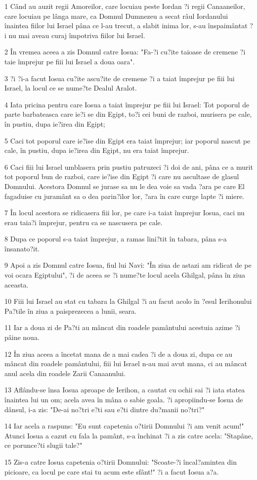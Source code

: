 \par 1 Când au auzit regii Amoreilor, care locuiau peste Iordan ?i regii Canaaneilor, care locuiau pe lânga mare, ca Domnul Dumnezeu a secat râul Iordanului înaintea fiilor lui Israel pâna ce l-au trecut, a slabit inima lor, s-au înspaimântat ?i nu mai aveau curaj împotriva fiilor lui Israel.
\par 2 În vremea aceea a zis Domnul catre Iosua: "Fa-?i cu?ite taioase de cremene ?i taie împrejur pe fiii lui Israel a doua oara".
\par 3 ?i ?i-a facut Iosua cu?ite ascu?ite de cremene ?i a taiat împrejur pe fiii lui Israel, la locul ce se nume?te Dealul Aralot.
\par 4 Iata pricina pentru care Iosua a taiat împrejur pe fiii lui Israel: Tot poporul de parte barbateasca care ie?i se din Egipt, to?i cei buni de razboi, murisera pe cale, în pustiu, dupa ie?irea din Egipt;
\par 5 Caci tot poporul care ie?ise din Egipt era taiat împrejur; iar poporul nascut pe cale, în pustiu, dupa ie?irea din Egipt, nu era taiat împrejur.
\par 6 Caci fiii lui Israel umblasera prin pustiu patruzeci ?i doi de ani, pâna ce a murit tot poporul bun de razboi, care ie?ise din Egipt ?i care nu ascultase de glasul Domnului. Acestora Domnul se jurase sa nu le dea voie sa vada ?ara pe care El fagaduise cu juramânt sa o dea parin?ilor lor, ?ara în care curge lapte ?i miere.
\par 7 În locul acestora se ridicasera fiii lor, pe care i-a taiat împrejur Iosua, caci nu erau taia?i împrejur, pentru ca se nascusera pe cale.
\par 8 Dupa ce poporul s-a taiat împrejur, a ramas lini?tit în tabara, pâna s-a însanato?it.
\par 9 Apoi a zis Domnul catre Iosua, fiul lui Navi: "În ziua de astazi am ridicat de pe voi ocara Egiptului", ?i de aceea se ?i nume?te locul acela Ghilgal, pâna în ziua aceasta.
\par 10 Fiii lui Israel au stat cu tabara la Ghilgal ?i au facut acolo în ?esul Ierihonului Pa?tile în ziua a paisprezecea a lunii, seara.
\par 11 Iar a doua zi de Pa?ti au mâncat din roadele pamântului acestuia azime ?i pâine noua.
\par 12 În ziua aceea a încetat mana de a mai cadea ?i de a doua zi, dupa ce au mâncat din roadele pamântului, fiii lui Israel n-au mai avut mana, ci au mâncat anul acela din roadele Zarii Canaanului.
\par 13 Aflându-se însa Iosua aproape de Ierihon, a cautat cu ochii sai ?i iata statea înaintea lui un om; acela avea în mâna o sabie goala. ?i apropiindu-se Iosua de dânsul, i-a zis: "De-ai no?tri e?ti sau e?ti dintre du?manii no?tri?"
\par 14 Iar acela a raspuns: "Eu sunt capetenia o?tirii Domnului ?i am venit acum!" Atunci Iosua a cazut cu fala la pamânt, s-a închinat ?i a zis catre acela: "Stapâne, ce porunce?ti slugii tale?"
\par 15 Zis-a catre Iosua capetenia o?tirii Domnului: "Scoate-?i încal?amintea din picioare, ca locul pe care stai tu acum este sfânt!" ?i a facut Iosua a?a.

